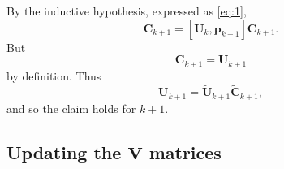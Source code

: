 \documentclass[11pt,a4paper]{article}
\newcommand{\0}{\M{0}}
\newcommand{\M}[1]{\mathbf{#1}}
\newcommand{\Mt}[1]{\tilde{\M{#1}}}
\newcommand{\ve}[1]{\mathbf{#1}}
\begin{document}
By the inductive hypothesis, expressed as \eqref{eq:1}, 
\begin{displaymath}
  [\Mt{U}_k  \Mt{C}_k, \ve{p}_{k+1}] \M{C}_{k+1}
  =
  [\M{U}_k, \ve{p}_{k+1}] \M{C}_{k+1}.
\end{displaymath}
But
\begin{displaymath}
  [\M{U}_k, \ve{p}_{k+1}] \M{C}_{k+1}
  =
  \M{U}_{k+1}
\end{displaymath}
by definition.  Thus
\begin{displaymath}
  \M{U}_{k+1} = \Mt{U}_{k+1} \Mt{C}_{k+1},
\end{displaymath}
and so the claim holds for $k+1$.

\subsection{Updating the $\M{V}$ matrices}
\end{document}
